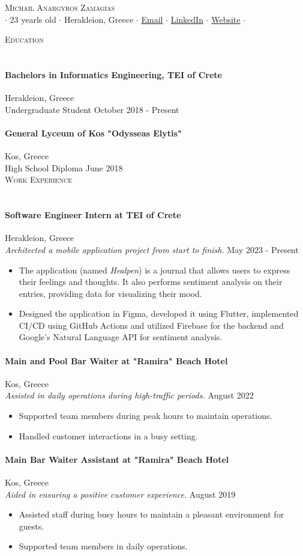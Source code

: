 \documentclass[a4paper, 11pt]{article}
\newcommand{\lineunder} {
	\vspace*{-8pt} \\
	\hspace*{-18pt} \hrulefill \\
}
\newcommand{\header} [1] {
	\vspace*{6mm}
	{\hspace*{-18pt}\vspace*{6pt} \textsc{#1}}
	\vspace*{-6pt} \lineunder
}
\newcommand{\education}[4]{ %
	\paragraph{#1} \hfill #3 \\ %
	#2 \hfill #4 \\ %
}
\newcommand{\workexperience}[5]{ %
	\paragraph{#1} \hfill #2 \\ %
	\textit{#3} \hfill #4 \\ %
	#5 %
}
\newcommand{\socialmediabutton}[2]{%
	\href{#1}{#2}
}
\begin{document}
\vspace*{-30pt}


\begin{center}
	{\Huge \scshape {Michail Anargyros Zamagias}} \\
	$\cdot$
	23 yearls old $\cdot$
	Herakleion, Greece $\cdot$
	\socialmediabutton{mailto:contact@mikezamayias.com}{Email} $\cdot$
	\socialmediabutton{https://linkedin.com/in/mikezamayias}{LinkedIn} $\cdot$
	\socialmediabutton{https://mikezamayias.com}{Website} $\cdot$
\end{center}


\header{Education}
\education
{Bachelors in Informatics Engineering, TEI of Crete}
{Undergraduate Student}
{Herakleion, Greece}
{October 2018 -  Present}
\education
{General Lyceum of Kos "Odysseas Elytis"}
{High School Diploma}
{Kos, Greece}
{June 2018}


\header{Work Experience}
\workexperience
{Software Engineer Intern at TEI of Crete}
{Herakleion, Greece}
{Architected a mobile application project from start to finish.}
{May 2023 - Present}
{
	\begin{itemize} \itemsep 1pt
		\item The application (named \textit{Healpen}) is a journal that allows users to express their feelings and thoughts. It also performs sentiment analysis on their entries, providing data for visualizing their mood.
		\item Designed the application in Figma, developed it using Flutter, implemented CI/CD using GitHub Actions and utilized Firebase for the backend and Google's Natural Language API for sentiment analysis.
	\end{itemize}
}
\workexperience
{Main and Pool Bar Waiter at "Ramira" Beach Hotel}
{Kos, Greece}
{Assisted in daily operations during high-traffic periods.}
{August 2022}
{
	\begin{itemize} \itemsep 1pt
		\item Supported team members during peak hours to maintain operations.
		\item Handled customer interactions in a busy setting.
	\end{itemize}
}
\workexperience
{Main Bar Waiter Assistant at "Ramira" Beach Hotel}
{Kos, Greece}
{Aided in ensuring a positive customer experience.}
{August 2019}
{
	\begin{itemize} \itemsep 1pt
		\item Assisted staff during busy hours to maintain a pleasant environment for guests.
		\item Supported team members in daily operations.
	\end{itemize}
}
\end{document}
